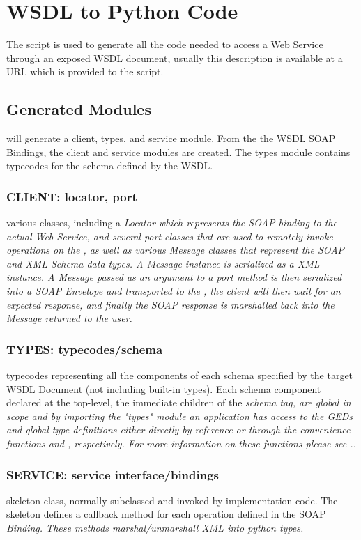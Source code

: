 \chapter{WSDL to Python Code}

The \WPY script is used to generate all the code needed to access a Web Service
through an exposed WSDL document, usually this description is available at a URL
which is provided to the script. 

\section{Generated Modules}
\WPY will generate a client, types, and service module.   From the the WSDL
SOAP Bindings, the client and service modules are created.  The types module
contains typecodes for the schema defined by the WSDL.  

\subsection{CLIENT: locator, port}
various classes, including a \it{Locator} which represents the
SOAP binding to the actual Web Service, and several \it{port} classes that are
used to remotely invoke  operations on the \WS, as well as various \it{Message}
classes that represent the SOAP and XML Schema data types.  A \it{Message}
instance is serialized as a XML instance.  A \it{Message} passed as an argument
to a \it{port} method is then serialized into a SOAP Envelope and transported to
the \WS, the client will then wait for an expected response, and finally the
SOAP response is marshalled back into the \it{Message} returned to the user.

\subsection{TYPES: typecodes/schema}
typecodes representing all the components of each schema specified by the target
WSDL Document (not including built-in types).  Each schema component declared at
the top-level, the immediate children of the \it{schema} tag, are global in
scope and by importing the "types" module an application has access to the GEDs
and global type definitions either directly by reference or through the
convenience functions  and , respectively.  For more
information on these functions please see ..

\subsection{SERVICE: service interface/bindings}
skeleton class, normally subclassed and invoked by implementation code.  The
skeleton defines a callback method for each operation defined in the SOAP
\it{Binding}.  These methods marshal/unmarshall XML into python types.

